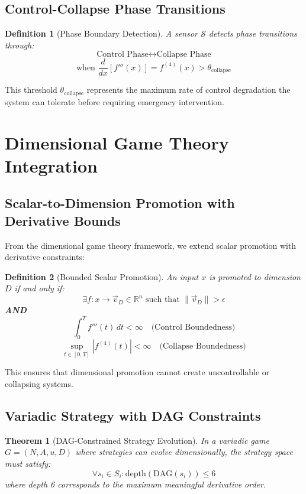 \documentclass[11pt]{article}
\newtheorem{theorem}{Theorem}
\newtheorem{definition}{Definition}
\begin{document}
\subsection{Control-Collapse Phase Transitions}

\begin{definition}[Phase Boundary Detection]
A sensor $\mathcal{S}$ detects phase transitions through:
$$\text{Control Phase} \leftrightarrow \text{Collapse Phase}$$
$$\text{when } \frac{d}{dx}[f'''(x)] = f^{(4)}(x) > \theta_{\text{collapse}}$$
\end{definition}

This threshold $\theta_{\text{collapse}}$ represents the maximum rate of control degradation the system can tolerate before requiring emergency intervention.

\section{Dimensional Game Theory Integration}

\subsection{Scalar-to-Dimension Promotion with Derivative Bounds}

From the dimensional game theory framework, we extend scalar promotion with derivative constraints:

\begin{definition}[Bounded Scalar Promotion]
An input $x$ is promoted to dimension $D$ if and only if:
$$\exists f: x \rightarrow \vec{v}_D \in \mathbb{R}^n \text{ such that } \|\vec{v}_D\| > \epsilon$$
\textbf{AND}
$$\int_0^T f'''(t) \, dt < \infty \quad \text{(Control Boundedness)}$$
$$\sup_{t \in [0,T]} |f^{(4)}(t)| < \infty \quad \text{(Collapse Boundedness)}$$
\end{definition}

This ensures that dimensional promotion cannot create uncontrollable or collapsing systems.

\subsection{Variadic Strategy with DAG Constraints}

\begin{theorem}[DAG-Constrained Strategy Evolution]
In a variadic game $G = (N, A, u, D)$ where strategies can evolve dimensionally, the strategy space must satisfy:
$$\forall s_i \in S_i: \text{depth}(\text{DAG}(s_i)) \leq 6$$
where depth 6 corresponds to the maximum meaningful derivative order.
\end{theorem}
\end{document}
